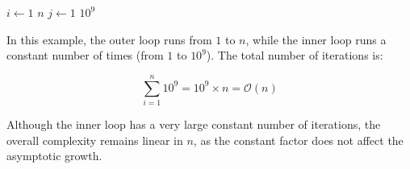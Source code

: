 \begin{example}

    \begin{codebox}
        \li \For $i \gets 1$ \To $n$ \Do
        \li     \For $j \gets 1$ \To $10^9$ \Do
        \li         {}
                \End
            \End
    \end{codebox}

    In this example, the outer loop runs from $1$ to $n$, while the inner loop runs a constant number of times (from $1$ to $10^9$). The total number of iterations is:

    \[
    \sum_{i=1}^{n} 10^9 = 10^9 \times n = \mathcal{O}(n)
    \]

    Although the inner loop has a very large constant number of iterations, the overall complexity remains linear in $n$, as the constant factor does not affect the asymptotic growth.
\end{example}


